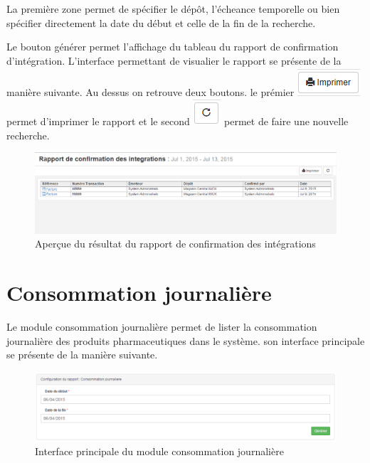 \documentclass[12pt,a4paper]{report}
\begin{document}
La première zone permet de spécifier le dépôt, l'écheance temporelle ou bien spécifier directement la date du début et celle de la fin de la recherche. 

Le bouton générer permet l'affichage du tableau du rapport de confirmation d'intégration. L'interface permettant de visualier le rapport se présente de la manière suivante. Au dessus on retrouve deux boutons. le prémier 
\includegraphics[scale=0.7]{pic/Print.png} permet d'imprimer le rapport et le second \includegraphics[scale=0.7]{pic/refresh.png} permet de faire une nouvelle recherche.

\begin{figure}[h]
\begin{center}
\includegraphics[width=14cm]{pic/RapConfirIntegr.png}
\end{center}
\caption{Aperçue du résultat du rapport de confirmation des intégrations}
\label{Aperçue du résultat du rapport de confirmation des intégrations}
\end{figure}


\newpage
\section{Consommation journalière}
Le module consommation journalière permet de lister la consommation journalière des produits pharmaceutiques dans le système.
son interface principale se présente de la manière suivante.

\begin{figure}[h]
\begin{center}
\includegraphics[width=14cm]{pic/ConsJour.png}
\end{center}
\caption{Interface principale du module consommation journalière}
\label{Interface principale du module consommation journalière}
\end{figure}
\end{document}
